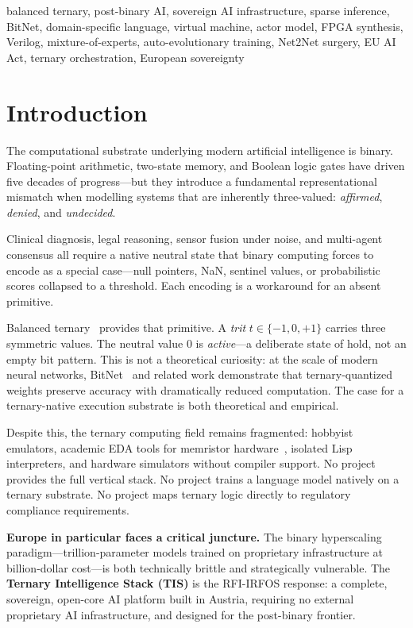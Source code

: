 \documentclass[journal,10pt,twocolumn]{IEEEtran}
\begin{document}
\begin{IEEEkeywords}
balanced ternary, post-binary AI, sovereign AI infrastructure, sparse
inference, BitNet, domain-specific language, virtual machine, actor model,
FPGA synthesis, Verilog, mixture-of-experts, auto-evolutionary training,
Net2Net surgery, EU AI Act, ternary orchestration, European sovereignty
\end{IEEEkeywords}

\section{Introduction}
\label{sec:intro}

The computational substrate underlying modern artificial intelligence is
binary. Floating-point arithmetic, two-state memory, and Boolean logic gates
have driven five decades of progress---but they introduce a fundamental
representational mismatch when modelling systems that are inherently
three-valued: \emph{affirmed}, \emph{denied}, and \emph{undecided}.

Clinical diagnosis, legal reasoning, sensor fusion under noise, and
multi-agent consensus all require a native neutral state that binary
computing forces to encode as a special case---null pointers, NaN, sentinel
values, or probabilistic scores collapsed to a threshold. Each encoding is a
workaround for an absent primitive.

Balanced ternary~\cite{knuth1997art} provides that primitive. A \emph{trit}
$t \in \{-1, 0, +1\}$ carries three symmetric values. The neutral value $0$
is \emph{active}---a deliberate state of hold, not an empty bit pattern.
This is not a theoretical curiosity: at the scale of modern neural networks,
BitNet~\cite{ma2024era} and related work demonstrate that ternary-quantized
weights preserve accuracy with dramatically reduced computation. The case for
a ternary-native execution substrate is both theoretical and empirical.

Despite this, the ternary computing field remains fragmented: hobbyist
emulators, academic EDA tools for memristor hardware~\cite{bos2020ternary},
isolated Lisp interpreters, and hardware simulators without compiler support.
No project provides the full vertical stack. No project trains a language
model natively on a ternary substrate. No project maps ternary logic directly
to regulatory compliance requirements.

\textbf{Europe in particular faces a critical juncture.} The binary
hyperscaling paradigm—trillion-parameter models trained on proprietary
infrastructure at billion-dollar cost—is both technically brittle and
strategically vulnerable. The \textbf{Ternary Intelligence Stack (TIS)} is
the RFI-IRFOS response: a complete, sovereign, open-core AI platform built in
Austria, requiring no external proprietary AI infrastructure, and designed for
the post-binary frontier.
\end{document}
